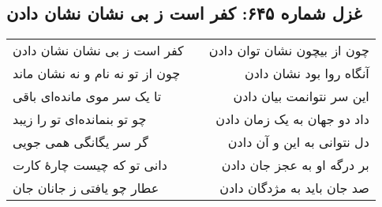 \begin{center}
\section*{غزل شماره ۶۴۵: کفر است ز بی نشان نشان دادن}
\label{sec:645}
\begin{longtable}{l p{0.5cm} r}
کفر است ز بی نشان نشان دادن
&&
چون از بیچون نشان توان دادن
\\
چون از تو نه نام و نه نشان ماند
&&
آنگاه روا بود نشان دادن
\\
تا یک سر موی مانده‌ای باقی
&&
این سر نتوانمت بیان دادن
\\
چو تو بنمانده‌ای تو را زیبد
&&
داد دو جهان به یک زمان دادن
\\
گر سر یگانگی همی جویی
&&
دل نتوانی به این و آن دادن
\\
دانی تو که چیست چارهٔ کارت
&&
بر درگه او به عجز جان دادن
\\
عطار چو یافتی ز جانان جان
&&
صد جان باید به مژدگان دادن
\\
\end{longtable}
\end{center}
